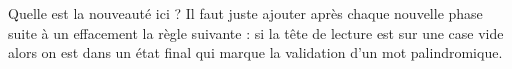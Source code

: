 \begin{multicols}{2}

\emptybox\emptybox%
	\emptybox\emptybox{}\emptybox\emptybox%
\emptybox\emptybox

\phantom{%
	\emptybox\emptybox\emptybox\emptybox}%
	\head


\medskip %

\emptybox\emptybox%
	\emptybox\emptybox{}\emptybox\emptybox%
\emptybox\emptybox

\phantom{%
	\emptybox\emptybox%
	\emptybox\emptybox\emptybox\emptybox}%
	\head
	

\medskip

\emptybox\emptybox%
	\emptybox\emptybox\emptybox{}\emptybox\emptybox\emptybox%
\emptybox\emptybox

\phantom{%
	\emptybox\emptybox\emptybox\emptybox\emptybox}%
	\head
	

\vfill\null
\columnbreak



\emptybox\emptybox%
	\emptybox\emptybox\emptybox{}\emptybox\emptybox\emptybox%
\emptybox\emptybox

\phantom{%
	\emptybox\emptybox%
	\emptybox\emptybox\emptybox}%
	\head
	

\medskip

\emptybox\emptybox%
	\emptybox\emptybox\emptybox\emptybox\emptybox\emptybox\emptybox%
\emptybox\emptybox

\phantom{%
	\emptybox\emptybox\emptybox\emptybox\emptybox}%
	\head

\vfill\null
\end{multicols}


\vspace{-1em}

Quelle est la nouveauté ici ? Il faut juste ajouter après chaque nouvelle phase suite à un effacement la règle suivante : si la tête de lecture est sur une case vide alors on est dans un état final qui marque la validation d'un mot palindromique.